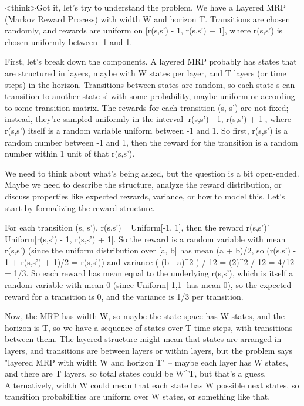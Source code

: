 <think>Got it, let's try to understand the problem. We have a Layered MRP (Markov Reward Process) with width W and horizon T. Transitions are chosen randomly, and rewards are uniform on [r(s,s') - 1, r(s,s') + 1], where r(s,s') is chosen uniformly between -1 and 1. 

First, let's break down the components. A layered MRP probably has states that are structured in layers, maybe with W states per layer, and T layers (or time steps) in the horizon. Transitions between states are random, so each state s can transition to another state s' with some probability, maybe uniform or according to some transition matrix. The rewards for each transition (s, s') are not fixed; instead, they're sampled uniformly in the interval [r(s,s') - 1, r(s,s') + 1], where r(s,s') itself is a random variable uniform between -1 and 1. So first, r(s,s') is a random number between -1 and 1, then the reward for the transition is a random number within 1 unit of that r(s,s').

We need to think about what's being asked, but the question is a bit open-ended. Maybe we need to describe the structure, analyze the reward distribution, or discuss properties like expected rewards, variance, or how to model this. Let's start by formalizing the reward structure.

For each transition (s, s'), r(s,s') ~ Uniform[-1, 1], then the reward r(s,s')' ~ Uniform[r(s,s') - 1, r(s,s') + 1]. So the reward is a random variable with mean r(s,s') (since the uniform distribution over [a, b] has mean (a + b)/2, so (r(s,s') - 1 + r(s,s') + 1)/2 = r(s,s')) and variance ( (b - a)^2 ) / 12 = (2)^2 / 12 = 4/12 = 1/3. So each reward has mean equal to the underlying r(s,s'), which is itself a random variable with mean 0 (since Uniform[-1,1] has mean 0), so the expected reward for a transition is 0, and the variance is 1/3 per transition.

Now, the MRP has width W, so maybe the state space has W states, and the horizon is T, so we have a sequence of states over T time steps, with transitions between them. The layered structure might mean that states are arranged in layers, and transitions are between layers or within layers, but the problem says "layered MRP with width W and horizon T" – maybe each layer has W states, and there are T layers, so total states could be W^T, but that's a guess. Alternatively, width W could mean that each state has W possible next states, so transition probabilities are uniform over W states, or something like that.

